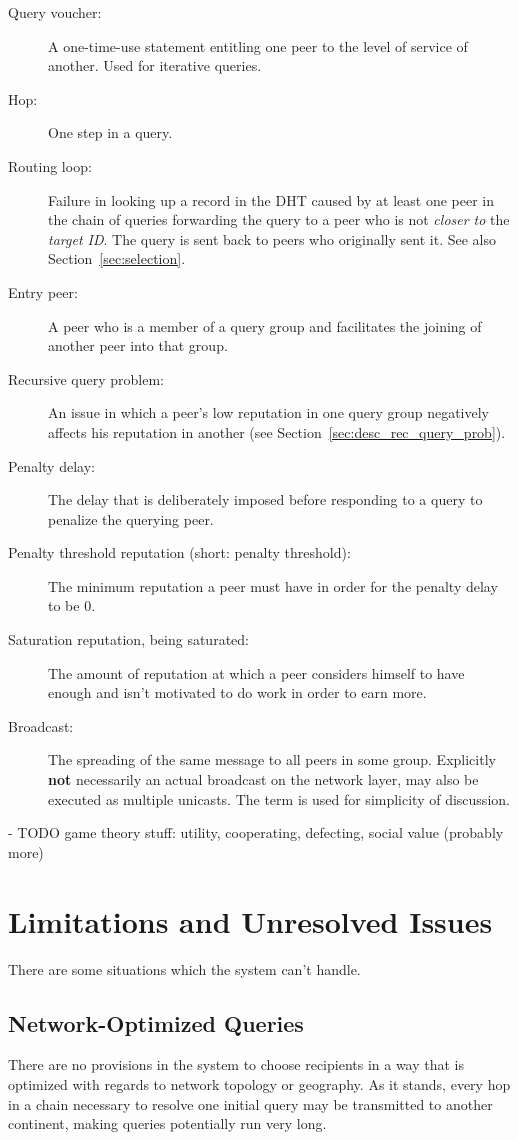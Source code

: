\begin{description}
\item[Query voucher:] A one-time-use statement entitling one peer to the level
of service of another. Used for iterative queries.
\item[Hop:] One step in a query.
\item[Routing loop:] Failure in looking up a record in the \ac{DHT} caused by at
least one peer in the chain of queries forwarding the query to a peer who is not
\emph{closer to} the \emph{target ID}. The query is sent back to peers who
originally sent it. See also Section~\ref{sec:selection}.
\item[Entry peer:] A peer who is a member of a query group and facilitates the
joining of another peer into that group.
\item[Recursive query problem:] An issue in which a peer's low reputation in one
query group negatively affects his reputation in another (see
Section~\ref{sec:desc_rec_query_prob}).
\item[Penalty delay:] The delay that is deliberately imposed before responding
to a query to penalize the querying peer.
\item[Penalty threshold reputation (short: penalty threshold):] The minimum
reputation a peer must have in order for the penalty delay to be 0.
\item[Saturation reputation, being saturated:] The amount of reputation at which
a peer considers himself to have enough and isn't motivated to do work in order
to earn more.
\item[Broadcast:] The spreading of the same message to all peers in some group.
Explicitly \textbf{not} necessarily an actual broadcast on the network layer,
may also be executed as multiple unicasts. The term is used for simplicity of
discussion.
\end{description}

- TODO game theory stuff: utility, cooperating, defecting, social value (probably
  more)

\section{Limitations and Unresolved Issues}
There are some situations which the system can't handle.

\subsection{Network-Optimized Queries}
There are no provisions in the system to choose recipients in a way that is
optimized with regards to network topology or geography. As it stands, every hop
in a chain necessary to resolve one initial query may be transmitted to another
continent, making queries potentially run very long.

